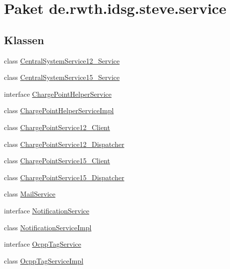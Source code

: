 \hypertarget{namespacede_1_1rwth_1_1idsg_1_1steve_1_1service}{\section{Paket de.\+rwth.\+idsg.\+steve.\+service}
\label{namespacede_1_1rwth_1_1idsg_1_1steve_1_1service}
}
\subsection*{Klassen}
\begin{DoxyCompactItemize}
\item 
class \hyperlink{classde_1_1rwth_1_1idsg_1_1steve_1_1service_1_1_central_system_service12___service}{Central\+System\+Service12\+\_\+\+Service}
\item 
class \hyperlink{classde_1_1rwth_1_1idsg_1_1steve_1_1service_1_1_central_system_service15___service}{Central\+System\+Service15\+\_\+\+Service}
\item 
interface \hyperlink{interfacede_1_1rwth_1_1idsg_1_1steve_1_1service_1_1_charge_point_helper_service}{Charge\+Point\+Helper\+Service}
\item 
class \hyperlink{classde_1_1rwth_1_1idsg_1_1steve_1_1service_1_1_charge_point_helper_service_impl}{Charge\+Point\+Helper\+Service\+Impl}
\item 
class \hyperlink{classde_1_1rwth_1_1idsg_1_1steve_1_1service_1_1_charge_point_service12___client}{Charge\+Point\+Service12\+\_\+\+Client}
\item 
class \hyperlink{classde_1_1rwth_1_1idsg_1_1steve_1_1service_1_1_charge_point_service12___dispatcher}{Charge\+Point\+Service12\+\_\+\+Dispatcher}
\item 
class \hyperlink{classde_1_1rwth_1_1idsg_1_1steve_1_1service_1_1_charge_point_service15___client}{Charge\+Point\+Service15\+\_\+\+Client}
\item 
class \hyperlink{classde_1_1rwth_1_1idsg_1_1steve_1_1service_1_1_charge_point_service15___dispatcher}{Charge\+Point\+Service15\+\_\+\+Dispatcher}
\item 
class \hyperlink{classde_1_1rwth_1_1idsg_1_1steve_1_1service_1_1_mail_service}{Mail\+Service}
\item 
interface \hyperlink{interfacede_1_1rwth_1_1idsg_1_1steve_1_1service_1_1_notification_service}{Notification\+Service}
\item 
class \hyperlink{classde_1_1rwth_1_1idsg_1_1steve_1_1service_1_1_notification_service_impl}{Notification\+Service\+Impl}
\item 
interface \hyperlink{interfacede_1_1rwth_1_1idsg_1_1steve_1_1service_1_1_ocpp_tag_service}{Ocpp\+Tag\+Service}
\item 
class \hyperlink{classde_1_1rwth_1_1idsg_1_1steve_1_1service_1_1_ocpp_tag_service_impl}{Ocpp\+Tag\+Service\+Impl}
\end{DoxyCompactItemize}
